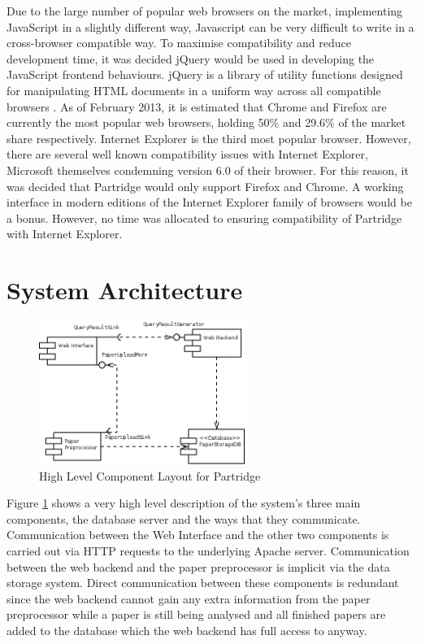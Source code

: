 Due to the large number of popular web browsers on the market, implementing
JavaScript in a slightly different way, Javascript can be very difficult to
write in a cross-browser compatible way. To maximise compatibility and reduce
development time, it was decided jQuery would be used in developing the
JavaScript frontend behaviours. jQuery is a library of utility functions
designed for manipulating HTML documents in a uniform way across all compatible
browsers \cite{jquery2013}. As of February 2013, it is estimated that Chrome and
Firefox are currently the most popular web browsers, holding 50\% and 29.6\% of
the market share respectively\cite{browserstats2013}. Internet Explorer is the
third most popular browser. However, there are several well known compatibility
issues with Internet Explorer, Microsoft themselves condemning version 6.0 of
their browser\cite{ie6death}. For this reason, it was decided that Partridge
would only support Firefox and Chrome. A working interface in modern editions
of the Internet Explorer family of browsers would be a bonus.  However, no time
was allocated to ensuring compatibility of Partridge with Internet Explorer.

\section{ System Architecture }


\begin{figure}[!ht]
\center
\includegraphics[width=0.6\textwidth]{images/design/components_high_level.png}
\caption{High Level Component Layout for Partridge}
\label{fig:high_level_components}
\end{figure}

Figure \ref{fig:high_level_components} shows a very high level description of
the system's three main components, the database server and the ways that they
communicate. Communication between the Web Interface and the other two
components is carried out via HTTP requests to the underlying Apache server.
Communication between the web backend and the paper preprocessor is implicit
via the data storage system. Direct communication between these components is
redundant since the web backend cannot gain any extra information from the
paper preprocessor while a paper is still being analysed and all finished
papers are added to the database which the web backend has full access to
anyway.


